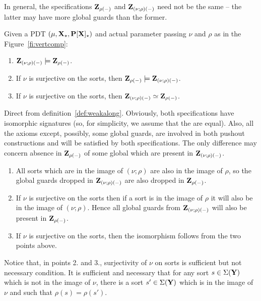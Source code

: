 In general, the specifications ${\bf Z_{\rho(-)}}$ and
${\bf Z_{(\nu;\rho)(-)}}$ need not be the same -- the latter may have
more global guards than the former.
\begin{fact}\label{fa:triv}
Given a PDT $(\mu,{\bf X}_\star,{\bf P[X]_\star})$
and actual parameter passing $\nu$
and $\rho$ as in the Figure~\ref{fi:vertcomp}: 
\begin{enumerate}\MyLPar
\item ${\bf Z_{(\nu;\rho)(-)}}\models {\bf Z_{\rho(-)}}$.
\item If $\nu$ is surjective on the sorts, then ${\bf Z_{\rho(-)}}\models
{\bf Z_{(\nu;\rho)(-)}}$.
\item If $\nu$ is
surjective on the sorts, then ${\bf Z_{(\nu;\rho)(-)}} \mathrel{\simeq} {\bf Z_{\rho(-)}}$.
\end{enumerate}
\end{fact}
\begin{PROOF}
Direct from definition~\ref{def:weakalong}. Obviously, both specifications
have isomorphic signatures (so, for simplicity, we assume that the are
equal). Also, all the axioms except, possibly, some global 
guards, are involved in both pushout constructions and will be satisfied by
both specifications. The only difference may concern absence in
${\bf Z_{\rho(-)}}$  of some global which are present in
${\bf Z_{(\nu;\rho)(-)}}$. 
\begin{enumerate}\MyLPar
\item  All sorts which are in the
image of $(\nu;\rho)$ are also in the image of $\rho$, so the global guards
dropped in ${\bf Z_{(\nu;\rho)(-)}}$ are also dropped in
${\bf Z_{\rho(-)}}$. 
\item If $\nu$ is surjective on the sorts then if a sort is in the image of
$\rho$ it will also be in the image of $(\nu;\rho)$. Hence all global guards
from ${\bf Z_{(\nu;\rho)(-)}}$ will also be present in ${\bf Z_{\rho(-)}}$.
\item If $\nu$ is surjective on the sorts, then the isomorphism follows from the
two points above. \vspace*{-2ex}
\end{enumerate}
\end{PROOF}
Notice that, in points 2. and 3., surjectivity of $\nu$ on sorts is sufficient but
not necessary condition. It is sufficient and necessary that for any sort $s\in\Sigma({\bf Y})$
which is not in the image of $\nu$, there is a sort  $s'\in\Sigma({\bf Y})$ which
is in the image of $\nu$ and such that $\rho(s)=\rho(s')$.
